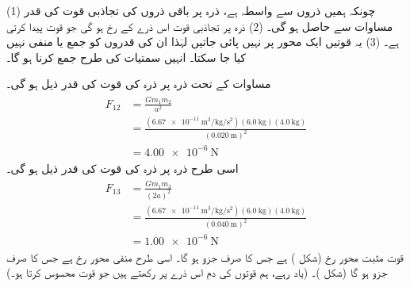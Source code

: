 (1)  چونکہ  ہمیں ذروں سے واسطہ ہے، ذرہ  پر باقی ذروں کی  تجاذبی قوت کی قدر  مساوات      سے حاصل ہو گی۔ (2)  ذرہ  پر تجاذبی قوت  اس ذرے  کے رخ ہو گی جو قوت پیدا کرتی ہے۔ (3)  یہ قوتیں ایک محور پر نہیں پائی جاتیں لہٰذا  ان  کی قدروں  کو جمع یا منفی نہیں کیا جا سکتا۔ انہیں سمتیات کی طرح جمع کرنا ہو گا۔

\quad
مساوات  کے تحت ذرہ  پر ذرہ  کی قوت  کی قدر ذیل ہو گی۔
\begin{gather}
\begin{aligned}
F_{12}&=\frac{Gm_1m_2}{a^2}\\
&=\frac{(\SI{6.67e-11}{\meter\cubed\per\kilo\gram\per\second\squared})(\SI{6.0}{\kilo\gram})(\SI{4.0}{\kilo\gram})}{(\SI{0.020}{\meter})^2}\\
&=\SI{4.00e-6}{\newton}
\end{aligned}
\end{gather}
اسی طرح ذرہ  پر ذرہ  کی قوت کی قدر ذیل ہو گی۔
\begin{gather}
\begin{aligned}
F_{13}&=\frac{Gm_1m_3}{(2a)^2}\\
&=\frac{(\SI{6.67e-11}{\meter\cubed\per\kilo\gram\per\second\squared})(\SI{6.0}{\kilo\gram})(\SI{4.0}{\kilo\gram})}{(\SI{0.040}{\meter})^2}\\
&=\SI{1.00e-6}{\newton}
\end{aligned}
\end{gather}
قوت  مثبت محور    رخ (شکل )  ہے جس کا صرف  جزو  ہو گا۔ اسی طرح   منفی محور  رخ ہے جس کا صرف  جزو  ہو گا (شکل )۔ (یاد  رہے، ہم قوتوں کی دم اس ذرے پر رکھتے ہیں جو قوت محسوس کرتا ہو۔)


